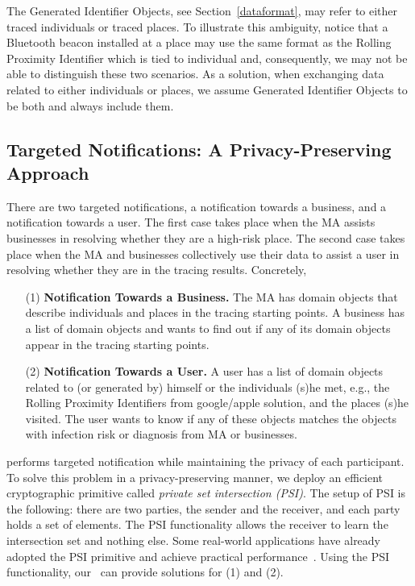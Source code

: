 The Generated Identifier Objects, see Section~\ref{dataformat}, may refer to either traced individuals or traced places. 
To illustrate this ambiguity, notice that a Bluetooth beacon installed at a place may use the same format as the Rolling Proximity Identifier which is tied to individual and, consequently, we may not be able to distinguish these two scenarios. 
As a solution, when exchanging data related to either individuals or places, we assume Generated Identifier Objects to be both and always include them.

\subsection{Targeted Notifications: A  Privacy-Preserving Approach}
There are two targeted notifications, a notification towards a business, and  a notification towards a user. The first case takes place when the MA assists businesses in resolving  whether they are a high-risk place. The second case takes place when the MA and businesses collectively use their data to assist a user in resolving whether they are in the tracing results. Concretely,

\begin{itemize}
    \item[(1)] \textbf{Notification Towards a Business.} The MA has domain objects that describe individuals and places in the tracing starting points.  A business has a list of domain objects and wants to find out if any of its domain objects appear in the tracing starting points. 
    
    \item[(2)] \textbf{Notification Towards a User.} A user has a list of domain objects related to (or generated  by) himself or the individuals (s)he met, e.g., the Rolling Proximity Identifiers from google/apple solution, and the places (s)he visited. The user wants to know if any of these objects matches the objects with infection risk or diagnosis from MA or businesses. 
\end{itemize}

\sysname performs targeted notification while maintaining the privacy of each participant. 
To solve this problem in a privacy-preserving manner, we deploy an efficient cryptographic primitive called \emph{ private set intersection (PSI)}. 
The setup of PSI is the following: there are two parties, the sender and the receiver, and each party holds a set of elements. 
The PSI functionality allows the receiver to learn the intersection set and nothing else. 
Some real-world applications have already adopted the PSI primitive and achieve practical performance~\cite{Kales2019}. 
Using the PSI functionality, our \sysname\ can provide solutions for (1) and (2). 

